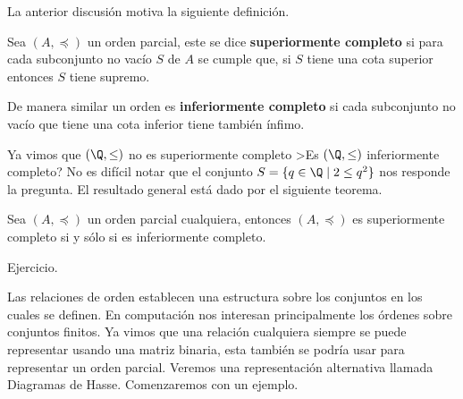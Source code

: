 La anterior discusión motiva la siguiente definición.

\begin{definicion}
Sea $(A,\preceq)$ un orden parcial, este se dice {\bf superiormente completo} si para cada subconjunto no vacío $S$ de $A$ se cumple que, si $S$ tiene una cota superior entonces $S$ tiene supremo.

De manera similar un orden es {\bf inferiormente completo} si cada subconjunto no vacío que tiene una cota inferior tiene también ínfimo.
\end{definicion}

Ya vimos que $(\Q,\leq)$ no es superiormente completo
>Es $(\Q,\leq)$ inferiormente completo?
No es difícil notar que el conjunto $S=\{q\in\Q\;|\;2\leq q^2\}$ nos responde la pregunta.
El resultado general está dado por el siguiente teorema.

\begin{teorema}
Sea $(A,\preceq)$ un orden parcial cualquiera, entonces $(A,\preceq)$ es superiormente completo si y sólo si es inferiormente completo.

\begin{demostracion}
Ejercicio. 
\end{demostracion}
\end{teorema}

Las relaciones de orden establecen una estructura sobre los conjuntos en los cuales se definen.
En computación nos interesan principalmente los órdenes sobre conjuntos finitos.
Ya vimos que una relación cualquiera siempre se puede representar usando una matriz binaria, esta también se podría usar para representar un orden parcial.
Veremos una representación alternativa llamada Diagramas de Hasse.
Comenzaremos con un ejemplo.

